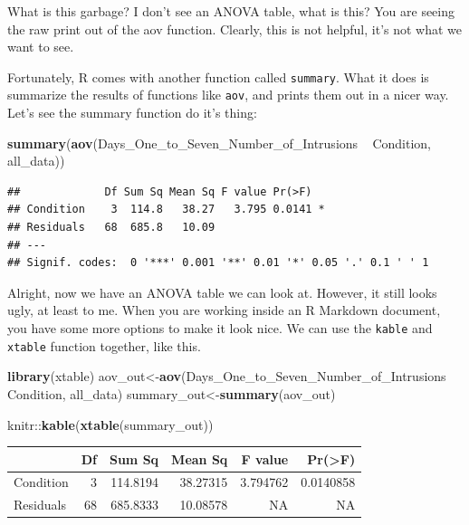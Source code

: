 \documentclass[]{book}
\newenvironment{Shaded}{\begin{snugshade}}{\end{snugshade}}
\newcommand{\KeywordTok}[1]{\textcolor[rgb]{0.13,0.29,0.53}{\textbf{{#1}}}}
\newcommand{\StringTok}[1]{\textcolor[rgb]{0.31,0.60,0.02}{{#1}}}
\newcommand{\NormalTok}[1]{{#1}}
\theoremstyle{definition}
\theoremstyle{definition}
\theoremstyle{definition}
\theoremstyle{remark}
\begin{document}
What is this garbage? I don't see an ANOVA table, what is this? You are
seeing the raw print out of the aov function. Clearly, this is not
helpful, it's not what we want to see.

Fortunately, R comes with another function called \texttt{summary}. What
it does is summarize the results of functions like \texttt{aov}, and
prints them out in a nicer way. Let's see the summary function do it's
thing:

\begin{Shaded}
\begin{Highlighting}[]
\KeywordTok{summary}\NormalTok{(}\KeywordTok{aov}\NormalTok{(Days_One_to_Seven_Number_of_Intrusions ~}\StringTok{ }\NormalTok{Condition, all_data))}
\end{Highlighting}
\end{Shaded}

\begin{verbatim}
##             Df Sum Sq Mean Sq F value Pr(>F)  
## Condition    3  114.8   38.27   3.795 0.0141 *
## Residuals   68  685.8   10.09                 
## ---
## Signif. codes:  0 '***' 0.001 '**' 0.01 '*' 0.05 '.' 0.1 ' ' 1
\end{verbatim}

Alright, now we have an ANOVA table we can look at. However, it still
looks ugly, at least to me. When you are working inside an R Markdown
document, you have some more options to make it look nice. We can use
the \texttt{kable} and \texttt{xtable} function together, like this.

\begin{Shaded}
\begin{Highlighting}[]
\KeywordTok{library}\NormalTok{(xtable)}
\NormalTok{aov_out<-}\KeywordTok{aov}\NormalTok{(Days_One_to_Seven_Number_of_Intrusions ~}\StringTok{ }\NormalTok{Condition, all_data)}
\NormalTok{summary_out<-}\KeywordTok{summary}\NormalTok{(aov_out)}

\NormalTok{knitr::}\KeywordTok{kable}\NormalTok{(}\KeywordTok{xtable}\NormalTok{(summary_out))}
\end{Highlighting}
\end{Shaded}

\begin{tabular}{l|r|r|r|r|r}
\hline
  & Df & Sum Sq & Mean Sq & F value & Pr(>F)\\
\hline
Condition & 3 & 114.8194 & 38.27315 & 3.794762 & 0.0140858\\
\hline
Residuals & 68 & 685.8333 & 10.08578 & NA & NA\\
\hline
\end{tabular}
\end{document}
